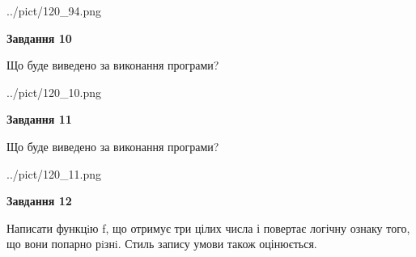 \documentclass[12pt, ukrainian]{article}
\begin{document}
{\begin {large}
\begin{center}
	{../pict/120_94.png}
\end{center}
\newpage

{\begin {center}\textbf{Завдання 10}\end {center}}

Що буде виведено за виконання програми?\par
\begin{center}
	{../pict/120_10.png}
\end{center}
\newpage

{\begin {center}\textbf{Завдання 11}\end {center}}

Що буде виведено за виконання програми?\par
\begin{center}
	{../pict/120_11.png}
\end{center}
\newpage

{\begin {center}\textbf{Завдання 12}\end {center}}


Написати функцiю f, що отримує три цілих числа і повертає логічну ознаку того, що вони попарно рiзнi. Стиль запису умови також оцінюється.\par
\newpage

\end {large}}
\end{document}
